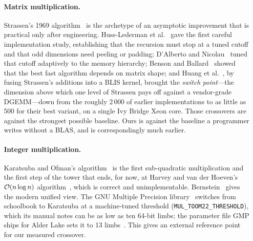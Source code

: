 \paragraph{Matrix multiplication.}
Strassen's 1969 algorithm~\cite{strassen1969gaussian} is the archetype of an
asymptotic improvement that is practical only after engineering.
Huss-Lederman et al.~\cite{husslederman1996implementation} gave the first
careful implementation study, establishing that the recursion must stop at a
tuned cutoff and that odd dimensions need peeling or padding; D'Alberto and
Nicolau~\cite{dalberto2007adaptive} tuned that cutoff adaptively to the memory
hierarchy; Benson and Ballard~\cite{benson2015framework} showed that the best
fast algorithm depends on matrix shape; and Huang et
al.~\cite{huang2016strassen}, by fusing Strassen's additions into a BLIS
kernel, brought the \emph{switch point}---the dimension above which one level of
Strassen pays off against a vendor-grade DGEMM---down from the roughly 2\,000
of earlier implementations to as little as 500 for their best variant, on a
single Ivy Bridge Xeon core. Those crossovers are against the strongest
possible baseline. Ours is against the baseline a
programmer writes without a BLAS, and is correspondingly much earlier.

\paragraph{Integer multiplication.}
Karatsuba and Ofman's algorithm~\cite{karatsuba1962multiplication} is the
first sub-quadratic multiplication and the first step of the tower that ends,
for now, at Harvey and van der Hoeven's $\mathcal{O}(n\log n)$
algorithm~\cite{harvey2021integer}, which is correct and
unimplementable. Bernstein~\cite{bernstein2001multidigit} gives the modern
unified view. The GNU Multiple Precision library~\cite{gmp2023manual} switches
from schoolbook to Karatsuba at a machine-tuned threshold
(\texttt{MUL\_TOOM22\_THRESHOLD}), which its manual notes can be as low as ten
64-bit limbs; the parameter file GMP ships for Alder Lake sets it to 13
limbs~\cite{gmp2022alderlake}. This gives an external reference point for our
measured crossover.

